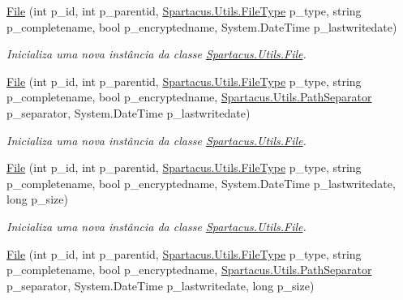 \begin{DoxyCompactItemize}
\hyperlink{classSpartacus_1_1Utils_1_1File_af45da8433267c8bf19fabb847eecffe3}{File} (int p\+\_\+id, int p\+\_\+parentid, \hyperlink{namespaceSpartacus_1_1Utils_a2bc44488e88db523cb2dcffaa6e77541}{Spartacus.\+Utils.\+File\+Type} p\+\_\+type, string p\+\_\+completename, bool p\+\_\+encryptedname, System.\+Date\+Time p\+\_\+lastwritedate)
\begin{DoxyCompactList}\small\item\em Inicializa uma nova instância da classe \hyperlink{classSpartacus_1_1Utils_1_1File}{Spartacus.\+Utils.\+File}. \end{DoxyCompactList}\item 
\hyperlink{classSpartacus_1_1Utils_1_1File_acc6184e5bf334a278f4c5c55102abd76}{File} (int p\+\_\+id, int p\+\_\+parentid, \hyperlink{namespaceSpartacus_1_1Utils_a2bc44488e88db523cb2dcffaa6e77541}{Spartacus.\+Utils.\+File\+Type} p\+\_\+type, string p\+\_\+completename, bool p\+\_\+encryptedname, \hyperlink{namespaceSpartacus_1_1Utils_a9ee24558a33d60b42674bae3eed2a094}{Spartacus.\+Utils.\+Path\+Separator} p\+\_\+separator, System.\+Date\+Time p\+\_\+lastwritedate)
\begin{DoxyCompactList}\small\item\em Inicializa uma nova instância da classe \hyperlink{classSpartacus_1_1Utils_1_1File}{Spartacus.\+Utils.\+File}. \end{DoxyCompactList}\item 
\hyperlink{classSpartacus_1_1Utils_1_1File_ae8af90ef790d3cf62e650b47fc5cab3d}{File} (int p\+\_\+id, int p\+\_\+parentid, \hyperlink{namespaceSpartacus_1_1Utils_a2bc44488e88db523cb2dcffaa6e77541}{Spartacus.\+Utils.\+File\+Type} p\+\_\+type, string p\+\_\+completename, bool p\+\_\+encryptedname, System.\+Date\+Time p\+\_\+lastwritedate, long p\+\_\+size)
\begin{DoxyCompactList}\small\item\em Inicializa uma nova instância da classe \hyperlink{classSpartacus_1_1Utils_1_1File}{Spartacus.\+Utils.\+File}. \end{DoxyCompactList}\item 
\hyperlink{classSpartacus_1_1Utils_1_1File_a7ee582b5ee023b1fedcce9102cffa226}{File} (int p\+\_\+id, int p\+\_\+parentid, \hyperlink{namespaceSpartacus_1_1Utils_a2bc44488e88db523cb2dcffaa6e77541}{Spartacus.\+Utils.\+File\+Type} p\+\_\+type, string p\+\_\+completename, bool p\+\_\+encryptedname, \hyperlink{namespaceSpartacus_1_1Utils_a9ee24558a33d60b42674bae3eed2a094}{Spartacus.\+Utils.\+Path\+Separator} p\+\_\+separator, System.\+Date\+Time p\+\_\+lastwritedate, long p\+\_\+size)

\end{DoxyCompactItemize}

